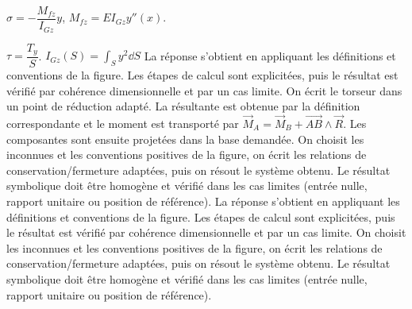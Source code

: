 \begin{corrigebox}
$\sigma = -\dfrac{M_{fz}}{I_{Gz}}y$, $M_{fz}= EI_{Gz}y''(x)$.

$\tau = \dfrac{T_y}{S}$.
$I_{Gz}(S) = \int_S y^2 \dd S$
La réponse s'obtient en appliquant les définitions et conventions de la
    figure. Les étapes de calcul sont explicitées, puis le résultat est vérifié par
    cohérence dimensionnelle et par un cas limite.
On écrit le torseur dans un point de réduction adapté. La résultante
        est obtenue par la définition correspondante et le moment est transporté par
        $\vec M_A=\vec M_B+\overrightarrow{AB}\wedge\vec R$. Les composantes sont ensuite
        projetées dans la base demandée.
On choisit les inconnues et les conventions positives de la figure,
        on écrit les relations de conservation/fermeture adaptées, puis on résout le
        système obtenu. Le résultat symbolique doit être homogène et vérifié dans les cas
        limites (entrée nulle, rapport unitaire ou position de référence).
La réponse s'obtient en appliquant les définitions et conventions de la
    figure. Les étapes de calcul sont explicitées, puis le résultat est vérifié par
    cohérence dimensionnelle et par un cas limite.
On choisit les inconnues et les conventions positives de la figure,
        on écrit les relations de conservation/fermeture adaptées, puis on résout le
        système obtenu. Le résultat symbolique doit être homogène et vérifié dans les cas
        limites (entrée nulle, rapport unitaire ou position de référence).
\end{corrigebox}
